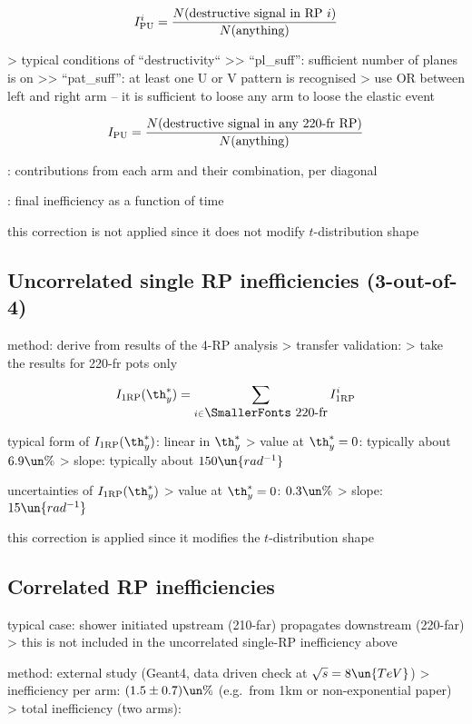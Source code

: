 $$I^{i}_{\rm PU} = {N(\hbox{destructive signal in RP $i$})\over N(\hbox{anything})}$$

\>> typical conditions of ``destructivity``
\>>> ``pl\_suff'': sufficient number of planes is on
\>>> ``pat\_suff'': at least one U or V pattern is recognised 
\>> use OR between left and right arm -- it is sufficient to loose any arm to loose the elastic event

$$I_{\rm PU} = {N(\hbox{destructive signal in any 220-fr RP})\over N(\hbox{anything})}$$


\> : contributions from each arm and their combination, per diagonal

\> : final inefficiency as a function of time

\> this correction is not applied since it does not modify $t$-distribution shape


\subsection{Uncorrelated single RP inefficiencies (3-out-of-4)}

\> method: derive from results of the 4-RP analysis
\>> transfer validation: 
\>> take the results for 220-fr pots only

$$I_{\rm 1RP}(\th_y^*) = \sum\limits_{i \in\hbox{\SmallerFonts 220-fr}} I_{\rm 1RP}^i$$

\> typical form of $I_{\rm 1RP}(\th_y^*)$: linear in $\th^*_y$
\>> value at $\th_y^* = 0$: typically about $6.9\un{\%}$
\>> slope: typically about $150\un{rad^{-1}}$

\> uncertainties of $I_{\rm 1RP}(\th_y^*)$
\>> value at $\th_y^* = 0$: $0.3\un{\%}$
\>> slope: $15\un{rad^{-1}}$

\> this correction is applied since it modifies the $t$-distribution shape


\subsection{Correlated RP inefficiencies}

\> typical case: shower initiated upstream (210-far) propagates downstream (220-far)
\>> this is not included in the uncorrelated single-RP inefficiency above

\> method: external study (Geant4, data driven check at $\sqrt s = 8\un{TeV}$)
\>> inefficiency per arm: $(1.5 \pm 0.7)\un{\%}$ (e.g.~from 1km or non-exponential paper)
\>> total inefficiency (two arms):

